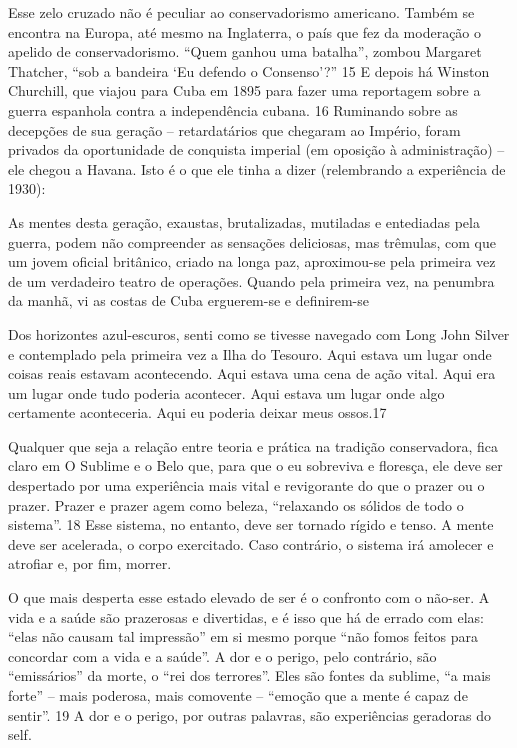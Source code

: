  \par 
Esse zelo cruzado não é peculiar ao conservadorismo americano. Também se encontra na Europa, até mesmo na Inglaterra, o país que fez da moderação o apelido de conservadorismo. “Quem ganhou uma batalha”, zombou Margaret Thatcher, “sob a bandeira ‘Eu defendo o Consenso’?” {\color{blue}15} E depois há Winston Churchill, que viajou para Cuba em 1895 para fazer uma reportagem sobre a guerra espanhola contra a independência cubana. {\color{blue}16} Ruminando sobre as decepções de sua geração – retardatários que chegaram ao Império, foram privados da oportunidade de conquista imperial (em oposição à administração) – ele chegou a Havana. Isto é o que ele tinha a dizer (relembrando a experiência de 1930):
 \par 
As mentes desta geração, exaustas, brutalizadas, mutiladas e entediadas pela guerra, podem não compreender as sensações deliciosas, mas trêmulas, com que um jovem oficial britânico, criado na longa paz, aproximou-se pela primeira vez de um verdadeiro teatro de operações. Quando pela primeira vez, na penumbra da manhã, vi as costas de Cuba erguerem-se e definirem-se
 \par 
Dos horizontes azul-escuros, senti como se tivesse navegado com Long John Silver e contemplado pela primeira vez a Ilha do Tesouro. Aqui estava um lugar onde coisas reais estavam acontecendo. Aqui estava uma cena de ação vital. Aqui era um lugar onde tudo poderia acontecer. Aqui estava um lugar onde algo certamente aconteceria. Aqui eu poderia deixar meus ossos.{\color{blue}17}
 \par 
Qualquer que seja a relação entre teoria e prática na tradição conservadora, fica claro em O Sublime e o Belo que, para que o eu sobreviva e floresça, ele deve ser despertado por uma experiência mais vital e revigorante do que o prazer ou o prazer. Prazer e prazer agem como beleza, “relaxando os sólidos de todo o sistema”. {\color{blue}18} Esse sistema, no entanto, deve ser tornado rígido e tenso. A mente deve ser acelerada, o corpo exercitado. Caso contrário, o sistema irá amolecer e atrofiar e, por fim, morrer.
 \par 
O que mais desperta esse estado elevado de ser é o confronto com o não-ser. A vida e a saúde são prazerosas e divertidas, e é isso que há de errado com elas: “elas não causam tal impressão” em si mesmo porque “não fomos feitos para concordar com a vida e a saúde”. A dor e o perigo, pelo contrário, são “emissários” da morte, o “rei dos terrores”. Eles são fontes da sublime, “a mais forte” – mais poderosa, mais comovente – “emoção que a mente é capaz de sentir”. {\color{blue}19} A dor e o perigo, por outras palavras, são experiências geradoras do self.
